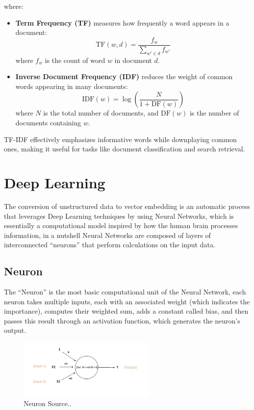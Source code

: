 where:
\begin{itemize}
    \item \textbf{Term Frequency (TF)} measures how frequently a word appears in a document:
    \begin{equation}
        \text{TF}(w, d) = \frac{f_w}{\sum_{w' \in d} f_{w'}}
    \end{equation}
    where \( f_w \) is the count of word \( w \) in document \( d \).

    \item \textbf{Inverse Document Frequency (IDF)} reduces the weight of common words appearing in many documents:
    \begin{equation}
        \text{IDF}(w) = \log \left( \frac{N}{1 + \text{DF}(w)} \right)
    \end{equation}
    where \( N \) is the total number of documents, and \( \text{DF}(w) \) is the number of documents containing \( w \).
\end{itemize}

TF-IDF effectively emphasizes informative words while downplaying common ones, making it useful for tasks like document classification and search retrieval.

\section{Deep Learning}
The conversion of unstructured data to vector embedding is an automatic process that leverages Deep Learning techniques by using Neural Networks, which is essentially a computational model inspired by how the human brain processes information, in a nutshell Neural Networks are composed of layers of interconnected “neurons” that perform calculations on the input data.

\subsection{Neuron}
The “Neuron” is the most basic computational unit of the Neural Network, each neuron takes multiple inputs, each with an associated weight (which indicates the importance), computes their weighted sum, adds a constant called bias, and then passes this result through an activation function, which generates the neuron's output.
\begin{figure}[h]
    \centering
    \includegraphics[width=0.6\textwidth]{IMAGES/immagine_2025-02-26_153339240.png}
    \caption{Neuron Source.\footnotemark.}
    \label{fig:Neuron}
\end{figure}

